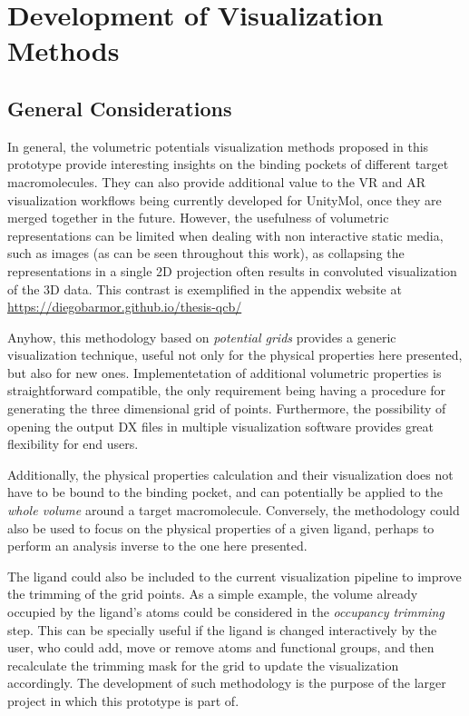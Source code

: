 \section{Development of Visualization Methods}
  \subsection{General Considerations}
    In general, the volumetric potentials visualization methods proposed in this prototype provide interesting insights on the binding pockets of different target macromolecules. They can also provide additional value to the VR and AR visualization workflows being currently developed for UnityMol, once they are merged together in the future. However, the usefulness of volumetric representations can be limited when dealing with non interactive static media, such as images (as can be seen throughout this work), as collapsing the representations in a single 2D projection often results in convoluted visualization of the 3D data. This contrast is exemplified in the appendix website at \url{https://diegobarmor.github.io/thesis-qcb/}

    Anyhow, this methodology based on \textit{potential grids} provides a generic visualization technique, useful not only for the physical properties here presented, but also for new ones. Implementetation of additional volumetric properties is straightforward compatible, the only requirement being having a procedure for generating the three dimensional grid of points. Furthermore, the possibility of opening the output DX files in multiple visualization software provides great flexibility for end users.

    Additionally, the physical properties calculation and their visualization does not have to be bound to the binding pocket, and can potentially be applied to the \textit{whole volume} around a target macromolecule. Conversely, the methodology could also be used to focus on the physical properties of a given ligand, perhaps to perform an analysis inverse to the one here presented.

    The ligand could also be included to the current visualization pipeline to improve the trimming of the grid points. As a simple example, the volume already occupied by the ligand's atoms could be considered in the \textit{occupancy trimming} step. This can be specially useful if the ligand is changed interactively by the user, who could add, move or remove atoms and functional groups, and then recalculate the trimming mask for the grid to update the visualization accordingly. The development of such methodology is the purpose of the larger project in which this prototype is part of.

